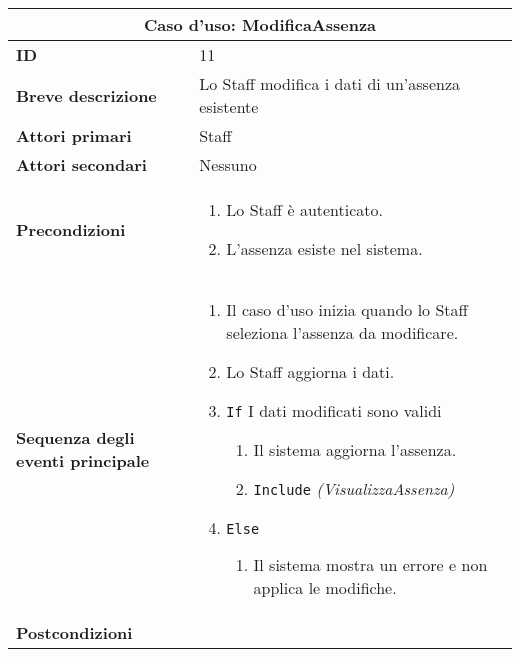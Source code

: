 \documentclass[a4paper]{report}
\begin{document}
\clearpage
\begin{table}[H]
\vspace*{-0cm}
\renewcommand{\arraystretch}{1.9}
\begin{tabular}{|p{3.9cm}|p{9.9cm}|}
\hline
\multicolumn{2}{|c|}{\textbf{Caso d’uso: ModificaAssenza}} \\ \hline
\textbf{ID} & 11 \\ \hline
\textbf{Breve descrizione} & Lo Staff modifica i dati di un’assenza esistente \\ \hline
\textbf{Attori primari} & Staff \\ \hline
\textbf{Attori secondari} & Nessuno \\ \hline
\textbf{Precondizioni} & \begin{enumerate}[leftmargin=14pt,label=\arabic*.,labelsep=0.5em,topsep=0pt,partopsep=0pt,parsep=0pt,itemsep=0pt]
    \item Lo Staff è autenticato.
    \item L’assenza esiste nel sistema.
\end{enumerate} \\ \hline
\textbf{Sequenza degli eventi principale} & \begin{enumerate}[leftmargin=14pt,label=\arabic*.,labelsep=0.5em,topsep=0pt,partopsep=0pt,parsep=0pt,itemsep=0pt]
    \item Il caso d’uso inizia quando lo Staff seleziona l’assenza da modificare.
    \item Lo Staff aggiorna i dati.
    \item \texttt{If} I dati modificati sono validi
    \begin{enumerate}[label=\arabic{enumi}.\arabic*.,leftmargin=22pt,labelsep=0.5em,topsep=0pt,partopsep=0pt,parsep=0pt,itemsep=0pt]
    \item Il sistema aggiorna l’assenza.
    \item \texttt{Include} \textit{(VisualizzaAssenza)}
    \end{enumerate}
    \item \texttt{Else}
    \begin{enumerate}[label=\arabic{enumi}.\arabic*.,leftmargin=22pt,labelsep=0.5em,topsep=0pt,partopsep=0pt,parsep=0pt,itemsep=0pt]
        \item Il sistema mostra un errore e non applica le modifiche.
    \end{enumerate}
\end{enumerate} \\ \hline
\textbf{Postcondizioni} & \begin{enumerate}[label=\arabic*.,leftmargin=14pt,labelsep=0.5em,topsep=0pt,partopsep=0pt,parsep=0pt,itemsep=0pt]

\end{enumerate}
\end{tabular}
\end{table}
\end{document}
